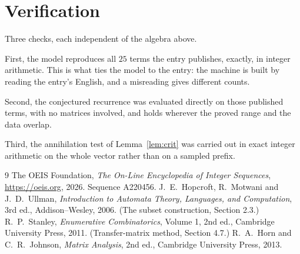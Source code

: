 \documentclass[11pt,a4paper]{article}
\theoremstyle{plain}
\theoremstyle{definition}
\begin{document}
\section{Verification}

Three checks, each independent of the algebra above.

First, the model reproduces all $25$ terms the entry publishes, exactly, in integer
arithmetic. This is what ties the model to the entry: the machine is built by reading the
entry's English, and a misreading gives different counts.

Second, the conjectured recurrence was evaluated directly on those published terms, with no
matrices involved, and holds wherever the proved range and the data overlap.

Third, the annihilation test of Lemma~\ref{lem:crit} was carried out in exact integer
arithmetic on the whole vector rather than on a sampled prefix.

\begin{thebibliography}{9}
 The OEIS Foundation, \emph{The On-Line Encyclopedia of Integer
Sequences}, \url{https://oeis.org}, 2026. Sequence A220456.
 J.~E.~Hopcroft, R.~Motwani and J.~D.~Ullman, \emph{Introduction to Automata
Theory, Languages, and Computation}, 3rd ed., Addison--Wesley, 2006. (The subset
construction, Section 2.3.)
 R.~P.~Stanley, \emph{Enumerative Combinatorics}, Volume 1, 2nd ed.,
Cambridge University Press, 2011. (Transfer-matrix method, Section 4.7.)
 R.~A.~Horn and C.~R.~Johnson, \emph{Matrix Analysis}, 2nd ed., Cambridge
University Press, 2013.
\end{thebibliography}
\end{document}
